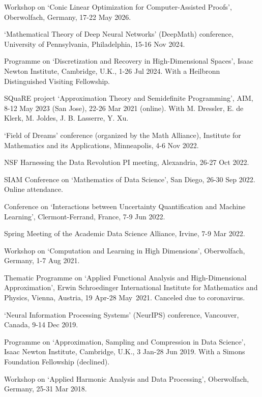\documentclass[11pt]{article}
\begin{document}
\bitemize
\item Workshop on `Conic Linear Optimization for Computer-Assisted Proofs', Oberwolfach, Germany, 17-22 May 2026.
\item `Mathematical Theory of Deep Neural Networks' (DeepMath) conference,
University of Pennsylvania,
Philadelphia, 15-16 Nov 2024.
\item Programme on `Discretization and Recovery in High-Dimensional Spaces',
Isaac Newton Institute, Cambridge, U.K., 1-26 Jul 2024.
With a Heilbronn Distinguished Visiting Fellowship.
\item SQuaRE project `Approximation Theory and Semidefinite Programming', AIM,  8-12 May 2023 (San Jose), 22-26 Mar 2021 (online). With M. Dressler, E. de Klerk, M. Joldes, J. B. Lasserre, Y. Xu.
\item `Field of Dreams' conference (organized by the Math Alliance),
Institute for Mathematics and its Applications, Minneapolis,  4-6 Nov 2022.
\item NSF Harnessing the Data Revolution PI meeting,
Alexandria,  26-27 Oct 2022.
\item SIAM Conference on `Mathematics of Data Science',
San Diego, 26-30 Sep 2022. Online attendance.
\item Conference on `Interactions between Uncertainty Quantification and Machine Learning',
Clermont-Ferrand, France, 7-9 Jun 2022.
\item Spring Meeting of the Academic Data Science Alliance, 
Irvine, 7-9 Mar 2022.
\item  Workshop on `Computation and Learning in High Dimensions', Oberwolfach, Germany, 1-7 Aug 2021.
\item Thematic Programme on `Applied Functional Analysis and High-Dimensional Approximation',
\mbox{Erwin} Schroedinger International Institute for Mathematics and Physics, Vienna, Austria, 
19 Apr-28 May~2021.
{\small Canceled due to coronavirus.}
\item `Neural Information Processing Systems' (NeurIPS) conference,
Vancouver, Canada, 9-14 Dec 2019.
\item Programme on `Approximation, Sampling and Compression in Data Science',
Isaac Newton Institute, Cambridge, U.K., 3 Jan-28 Jun 2019.
With a Simons Foundation Fellowship (declined).
\item  Workshop on `Applied Harmonic Analysis and Data Processing', Oberwolfach, Germany, 25-31 Mar 2018.
\end{document}
